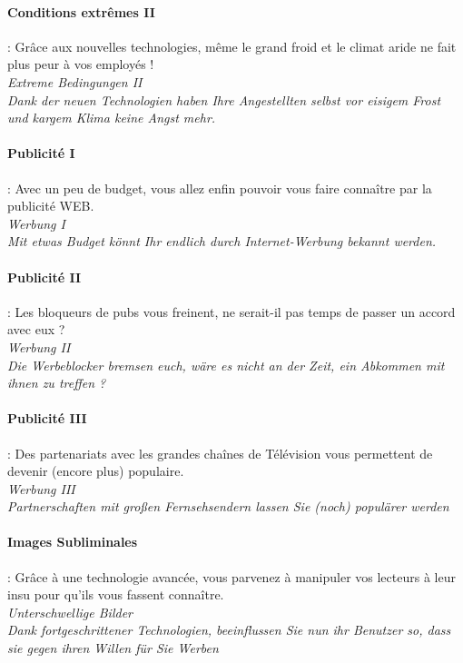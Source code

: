 \documentclass[10pt,a4paper]{article}
\begin{document}
\paragraph{Conditions extrêmes II} : Grâce aux nouvelles technologies, même le grand froid et le climat aride ne fait plus peur à vos employés !\\

\textit{Extreme Bedingungen II}\\
\textit{Dank der neuen Technologien haben Ihre Angestellten selbst vor eisigem Frost und kargem Klima keine Angst mehr.}


\paragraph{Publicité I} : Avec un peu de budget, vous allez enfin pouvoir vous faire connaître par la publicité WEB.\\
\textit{Werbung I}\\
\textit{Mit etwas Budget könnt Ihr endlich durch Internet-Werbung bekannt werden.}


\paragraph{Publicité II} : Les bloqueurs de pubs vous freinent, ne serait-il pas temps de passer un accord avec eux ?\\
\textit{Werbung II}\\
\textit{Die Werbeblocker bremsen euch, wäre es nicht an der Zeit, ein Abkommen mit ihnen zu treffen ?}


\paragraph{Publicité III} : Des partenariats avec les grandes chaînes de Télévision vous permettent de devenir (encore plus) populaire.\\
\textit{Werbung III}\\
\textit{Partnerschaften mit gro\ss en Fernsehsendern lassen Sie (noch) populärer werden}


\paragraph{Images Subliminales} : Grâce à une technologie avancée, vous parvenez à manipuler vos lecteurs à leur insu pour qu'ils vous fassent connaître.\\
\textit{Unterschwellige Bilder}\\
\textit{Dank fortgeschrittener Technologien, beeinflussen Sie nun ihr Benutzer so, dass sie gegen ihren Willen für Sie Werben}
\end{document}
